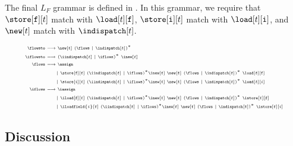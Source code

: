 The final $L_F$ grammar is defined in . In this grammar, we require that $\store[\texttt{f}][t]$
match with $\load[t][\texttt{f}]$, $\store[\texttt{i}][t]$ match with $\load[t][\texttt{i}]$, and $\new[t]$ match with $\indispatch[t]$. 

\begin{equation} \tiny
\label{eqn:finalNewLF}
\begin{split}
\flowsto & \longrightarrow \new[t]~(\flows~|~\indispatch[t])^*\\
\iflowsto & \longrightarrow (\iindispatch[t]~|~\iflows)^*~\inew[t]\\
\flows & \longrightarrow \assign\\&\qquad|~\store[\texttt{f}][t] \ (\iindispatch[t]~|~\iflows)^*\inew[t]~\new[t]~(\flows~|~\indispatch[t])^* \ \load[t][\texttt{f}]\\&\qquad|~\store[i][t] \ (\iindispatch[t]~|~\iflows)^*\inew[t]~\new[t]~(\flows~|~\indispatch[t])^* \ \load[t][i]\\
\iflows & \longrightarrow \iassign\\&\qquad|~\iload[\texttt{f}][t] \ (\iindispatch[t]~|~\iflows)^*\inew[t]~\new[t]~(\flows~|~\indispatch[t])^* \ \istore[t][\texttt{f}]\\&\qquad|~\iloadfield{i}[t] \ (\iindispatch[t]~|~\iflows)^*\inew[t]~\new[t]~(\flows~|~\indispatch[t])^* \ \istore[t][i]\\
\end{split}
\end{equation}

\subsection{Discussion}
\label{subsec:discussion}

